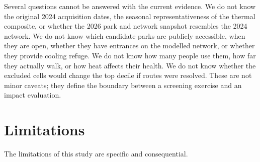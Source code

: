 \documentclass[times,twoside]{_Templates/MultiTargetManuscript}
\begin{document}
Several questions cannot be answered with the current evidence. We do not know
the original 2024 acquisition dates, the seasonal representativeness of the
thermal composite, or whether the 2026 park and network snapshot resembles the
2024 network. We do not know which candidate parks are publicly accessible, when
they are open, whether they have entrances on the modelled network, or whether
they provide cooling refuge. We do not know how many people use them, how far
they actually walk, or how heat affects their health. We do not know whether the
excluded cells would change the top decile if routes were resolved. These are
not minor caveats; they define the boundary between a screening exercise and an
impact evaluation.

\section{Limitations}

The limitations of this study are specific and consequential.
\end{document}
